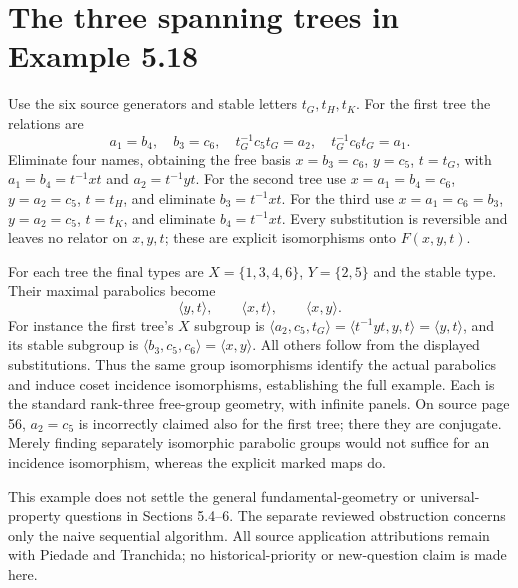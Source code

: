 \section{The three spanning trees in Example 5.18}
Use the six source generators and stable letters $t_G,t_H,t_K$.
For the first tree the relations are
\[
 a_1=b_4,\quad b_3=c_6,\quad t_G^{-1}c_5t_G=a_2,
 \quad t_G^{-1}c_6t_G=a_1.
\]
Eliminate four names, obtaining the free basis
$x=b_3=c_6$, $y=c_5$, $t=t_G$, with
$a_1=b_4=t^{-1}xt$ and $a_2=t^{-1}yt$.
For the second tree use $x=a_1=b_4=c_6$, $y=a_2=c_5$, $t=t_H$,
and eliminate $b_3=t^{-1}xt$. For the third use
$x=a_1=c_6=b_3$, $y=a_2=c_5$, $t=t_K$,
and eliminate $b_4=t^{-1}xt$.
Every substitution is reversible and leaves no relator on $x,y,t$;
these are explicit isomorphisms onto $F(x,y,t)$.

For each tree the final types are $X=\{1,3,4,6\}$,
$Y=\{2,5\}$ and the stable type. Their maximal parabolics become
\[
 \langle y,t\rangle,\qquad\langle x,t\rangle,\qquad\langle x,y\rangle.
\]
For instance the first tree's $X$ subgroup is
$\langle a_2,c_5,t_G\rangle=\langle t^{-1}yt,y,t\rangle
=\langle y,t\rangle$, and its stable subgroup is
$\langle b_3,c_5,c_6\rangle=\langle x,y\rangle$.
All others follow from the displayed substitutions. Thus the same
group isomorphisms identify the actual parabolics and induce coset
incidence isomorphisms, establishing the full example. Each is the
standard rank-three free-group geometry, with infinite panels.
On source page 56, $a_2=c_5$ is incorrectly claimed also for the
first tree; there they are conjugate. Merely finding separately
isomorphic parabolic groups would not suffice for an incidence
isomorphism, whereas the explicit marked maps do.

This example does not settle the general fundamental-geometry or
universal-property questions in Sections 5.4--6. The separate reviewed
obstruction concerns only the naive sequential algorithm. All source
application attributions remain with Piedade and Tranchida; no
historical-priority or new-question claim is made here.

